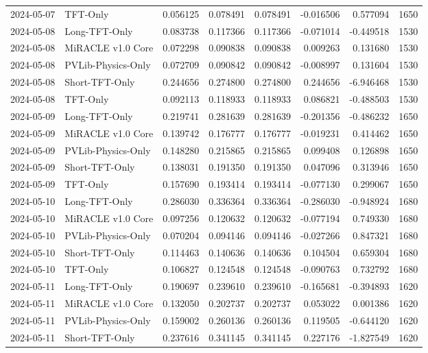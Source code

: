 \begin{tabular}{llrrrrrr}
2024-05-07 & TFT-Only & 0.056125 & 0.078491 & 0.078491 & -0.016506 & 0.577094 & 1650 \\
2024-05-08 & Long-TFT-Only & 0.083738 & 0.117366 & 0.117366 & -0.071014 & -0.449518 & 1530 \\
2024-05-08 & MiRACLE v1.0 Core & 0.072298 & 0.090838 & 0.090838 & 0.009263 & 0.131680 & 1530 \\
2024-05-08 & PVLib-Physics-Only & 0.072709 & 0.090842 & 0.090842 & -0.008997 & 0.131604 & 1530 \\
2024-05-08 & Short-TFT-Only & 0.244656 & 0.274800 & 0.274800 & 0.244656 & -6.946468 & 1530 \\
2024-05-08 & TFT-Only & 0.092113 & 0.118933 & 0.118933 & 0.086821 & -0.488503 & 1530 \\
2024-05-09 & Long-TFT-Only & 0.219741 & 0.281639 & 0.281639 & -0.201356 & -0.486232 & 1650 \\
2024-05-09 & MiRACLE v1.0 Core & 0.139742 & 0.176777 & 0.176777 & -0.019231 & 0.414462 & 1650 \\
2024-05-09 & PVLib-Physics-Only & 0.148280 & 0.215865 & 0.215865 & 0.099408 & 0.126898 & 1650 \\
2024-05-09 & Short-TFT-Only & 0.138031 & 0.191350 & 0.191350 & 0.047096 & 0.313946 & 1650 \\
2024-05-09 & TFT-Only & 0.157690 & 0.193414 & 0.193414 & -0.077130 & 0.299067 & 1650 \\
2024-05-10 & Long-TFT-Only & 0.286030 & 0.336364 & 0.336364 & -0.286030 & -0.948924 & 1680 \\
2024-05-10 & MiRACLE v1.0 Core & 0.097256 & 0.120632 & 0.120632 & -0.077194 & 0.749330 & 1680 \\
2024-05-10 & PVLib-Physics-Only & 0.070204 & 0.094146 & 0.094146 & -0.027266 & 0.847321 & 1680 \\
2024-05-10 & Short-TFT-Only & 0.114463 & 0.140636 & 0.140636 & 0.104504 & 0.659304 & 1680 \\
2024-05-10 & TFT-Only & 0.106827 & 0.124548 & 0.124548 & -0.090763 & 0.732792 & 1680 \\
2024-05-11 & Long-TFT-Only & 0.190697 & 0.239610 & 0.239610 & -0.165681 & -0.394893 & 1620 \\
2024-05-11 & MiRACLE v1.0 Core & 0.132050 & 0.202737 & 0.202737 & 0.053022 & 0.001386 & 1620 \\
2024-05-11 & PVLib-Physics-Only & 0.159002 & 0.260136 & 0.260136 & 0.119505 & -0.644120 & 1620 \\
2024-05-11 & Short-TFT-Only & 0.237616 & 0.341145 & 0.341145 & 0.227176 & -1.827549 & 1620 \\

\end{tabular}

